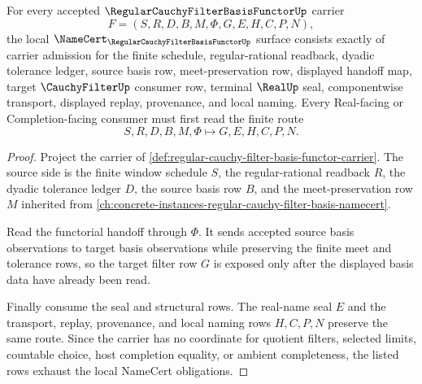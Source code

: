 \begin{theorem}
\label{thm:regular-cauchy-filter-basis-functor-namecert-obligations}
For every accepted $\RegularCauchyFilterBasisFunctorUp$ carrier
$$
F=(S,R,D,B,M,\Phi,G,E,H,C,P,N),
$$
the local $\NameCert_{\RegularCauchyFilterBasisFunctorUp}$ surface consists exactly of carrier admission for the finite schedule, regular-rational readback, dyadic tolerance ledger, source basis row, meet-preservation row, displayed handoff map, target $\CauchyFilterUp$ consumer row, terminal $\RealUp$ seal, componentwise transport, displayed replay, provenance, and local naming. Every Real-facing or Completion-facing consumer must first read the finite route
$$
S,R,D,B,M,\Phi \longmapsto G,E,H,C,P,N .
$$
\end{theorem}
\begin{proof}
Project the carrier of \autoref{def:regular-cauchy-filter-basis-functor-carrier}. The source side is the finite window schedule $S$, the regular-rational readback $R$, the dyadic tolerance ledger $D$, the source basis row $B$, and the meet-preservation row $M$ inherited from \autoref{ch:concrete-instances-regular-cauchy-filter-basis-namecert}.

Read the functorial handoff through $\Phi$. It sends accepted source basis observations to target basis observations while preserving the finite meet and tolerance rows, so the target filter row $G$ is exposed only after the displayed basis data have already been read.

Finally consume the seal and structural rows. The real-name seal $E$ and the transport, replay, provenance, and local naming rows $H,C,P,N$ preserve the same route. Since the carrier has no coordinate for quotient filters, selected limits, countable choice, host completion equality, or ambient completeness, the listed rows exhaust the local NameCert obligations.
\end{proof}

